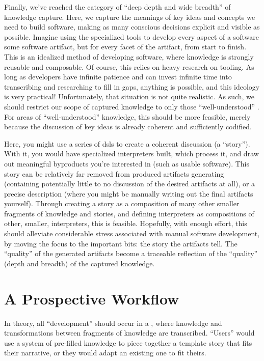 Finally, we've reached the category of ``deep depth and wide breadth'' of
knowledge capture. Here, we capture the meanings of key ideas and concepts we
need to build software, making as many conscious decisions explicit and visible
as possible. Imagine using the specialized tools to develop every aspect of a
software some software artifact, but for every facet of the artifact, from start
to finish. This is an idealized method of developing software, where knowledge
is strongly reusable and composable. Of course, this relies on heavy research on
tooling. As long as developers have infinite patience and can invest infinite
time into transcribing and researching to fill in gaps, anything is possible,
and this ideology is very practical! Unfortunately, that situation is not quite
realistic. As such, we should restrict our scope of captured knowledge to only
those ``well-understood'' \cite{well-understood}. For areas of
``well-understood'' knowledge, this should be more feasible, merely because the
discussion of key ideas is already coherent and sufficiently codified.

Here, you might use a series of \acsp{dsl} to create a coherent discussion (a
``story''). With it, you would have specialized interpreters built, which
process it, and draw out meaningful byproducts you're interested in (such as
usable software). This story can be relatively far removed from produced
artifacts generating (containing potentially little to no discussion of the
desired artifacts at all), or a precise description (where you might be manually
writing out the final artifacts yourself). Through creating a story as a
composition of many other smaller fragments of knowledge and stories, and
defining interpreters as compositions of other, smaller, interpreters, this is
feasible. Hopefully, with enough effort, this should alleviate considerable
stress associated with manual software development, by moving the focus to the
important bits: the story the artifacts tell. The ``quality'' of the generated
artifacts become a traceable reflection of the ``quality'' (depth and breadth)
of the captured knowledge.

\section{A Prospective Workflow}
\label{chap:ideology:sec:a_prospective_workflow}

In theory, all ``development'' should occur in a , where knowledge and
transformations between fragments of knowledge are transcribed. ``Users'' would
use a system of pre-filled knowledge to piece together a template story that
fits their narrative, or they would adapt an existing one to fit theirs.

